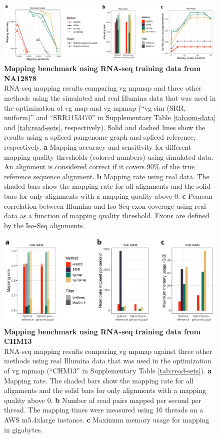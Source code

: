\documentclass[11pt]{ucthesis}
\begin{document}
\begin{figure}[H]
\begin{center}
\includegraphics[width=\textwidth]{mpmapfigures/figureS3.pdf}
\caption{\textbf{Mapping benchmark using RNA-seq training data from NA12878} \\
RNA-seq mapping results comparing vg mpmap and three other methods using the simulated and real Illumina data that was used in the optimization of vg map and vg mpmap (``vg sim (SRR, uniform)'' and ``SRR1153470'' in Supplementary Table \ref{tab:sim-data} and \ref{tab:read-sets}, respectively). Solid and dashed lines show the results using a spliced pangenome graph and spliced reference, respectively. \textbf{a} Mapping accuracy and sensitivity for different mapping quality thresholds (colored numbers) using simulated data. An alignment is considered correct if it covers 90\% of the true reference sequence alignment. \textbf{b} Mapping rate using real data. The shaded bars show the mapping rate for all alignments and the solid bars for only alignments with a mapping quality above 0. \textbf{c} Pearson correlation between Illumina and Iso-Seq exon coverage using real data as a function of mapping quality threshold. Exons are defined by the Iso-Seq alignments.
} \label{fig:mapping-srr}
\end{center}
\end{figure}

\begin{figure}[H]
\begin{center}
\includegraphics[width=\textwidth]{mpmapfigures/figureS4.pdf}
\caption{\textbf{Mapping benchmark using RNA-seq training data from CHM13} \\
RNA-seq mapping results comparing vg mpmap against three other methods using real Illumina data that was used in the optimization of vg mpmap (``CHM13'' in Supplementary Table \ref{tab:read-sets}). \textbf{a} Mapping rate. The shaded bars show the mapping rate for all alignments and the solid bars for only alignments with a mapping quality above 0. \textbf{b} Number of read pairs mapped per second per thread. The mapping times were measured using 16 threads on a AWS m5.4xlarge instance. \textbf{c} Maximum memory usage for mapping in gigabytes. 
} \label{fig:mapping-t2t}
\end{center}
\end{figure}
\end{document}
